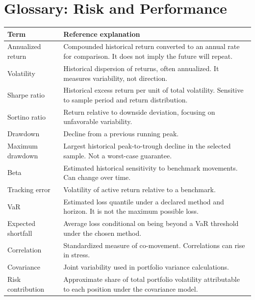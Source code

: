 \documentclass[11pt]{article}
\begin{document}
\section{Glossary: Risk and Performance}
\begin{longtable}{p{}p{}}
\toprule
Term & Reference explanation\\
\midrule
Annualized return & Compounded historical return converted to an annual rate for comparison. It does not imply the future will repeat.\\
Volatility & Historical dispersion of returns, often annualized. It measures variability, not direction.\\
Sharpe ratio & Historical excess return per unit of total volatility. Sensitive to sample period and return distribution.\\
Sortino ratio & Return relative to downside deviation, focusing on unfavorable variability.\\
Drawdown & Decline from a previous running peak.\\
Maximum drawdown & Largest historical peak-to-trough decline in the selected sample. Not a worst-case guarantee.\\
Beta & Estimated historical sensitivity to benchmark movements. Can change over time.\\
Tracking error & Volatility of active return relative to a benchmark.\\
VaR & Estimated loss quantile under a declared method and horizon. It is not the maximum possible loss.\\
Expected shortfall & Average loss conditional on being beyond a VaR threshold under the chosen method.\\
Correlation & Standardized measure of co-movement. Correlations can rise in stress.\\
Covariance & Joint variability used in portfolio variance calculations.\\
Risk contribution & Approximate share of total portfolio volatility attributable to each position under the covariance model.\\
\bottomrule
\end{longtable}
\end{document}
